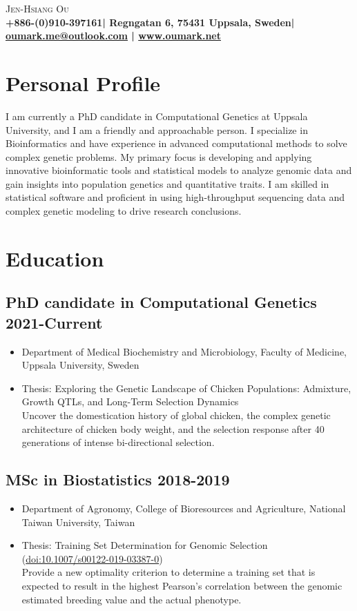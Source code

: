 \documentclass[10pt]{article}
\makeatletter
\def\phone{+886-(0)910-397161}
\def\address{Regngatan 6, 75431 Uppsala, Sweden}
\def\email{oumark.me@outlook.com}
\def\web{www.oumark.net}
\makeatother
\begin{document}
\begin{center}
{\LARGE\scshape Jen-Hsiang Ou}\\[2pt]
{\color{gray}\bf\phone | \address | \href{mailto:\email}{\email} | \href{\web}{\web}}
\end{center}


\section*{Personal Profile}
I am currently a PhD candidate in Computational Genetics at Uppsala University, and I am a friendly and approachable person. I specialize in Bioinformatics and have experience in advanced computational methods to solve complex genetic problems. My primary focus is developing and applying innovative bioinformatic tools and statistical models to analyze genomic data and gain insights into population genetics and quantitative traits. I am skilled in statistical software and proficient in using high-throughput sequencing data and complex genetic modeling to drive research conclusions.


\section*{Education}

\subsection*{PhD candidate in Computational Genetics \hfill 2021-Current}
\begin{itemize}
\item Department of Medical Biochemistry and Microbiology, Faculty of Medicine, Uppsala University, Sweden
\item Thesis: Exploring the Genetic Landscape of Chicken Populations: Admixture, Growth QTLs, and Long-Term Selection Dynamics \\ {\color{gray} Uncover the domestication history of global chicken, the complex genetic architecture of chicken body weight, and the selection response after 40 generations of intense bi-directional selection.}
\end{itemize}


\subsection*{MSc in Biostatistics \hfill 2018-2019}
\begin{itemize}
\item Department of Agronomy, College of Bioresources and Agriculture, National Taiwan University, Taiwan
\item Thesis: Training Set Determination for Genomic Selection (\href{https://doi.org/10.1007/s00122-019-03387-0}{doi:10.1007/s00122-019-03387-0}) \\ {\color{gray} Provide a new optimality criterion to determine a training set that is expected to result in the highest Pearson's correlation between the genomic estimated breeding value and the actual phenotype.}
\end{itemize}
\end{document}
